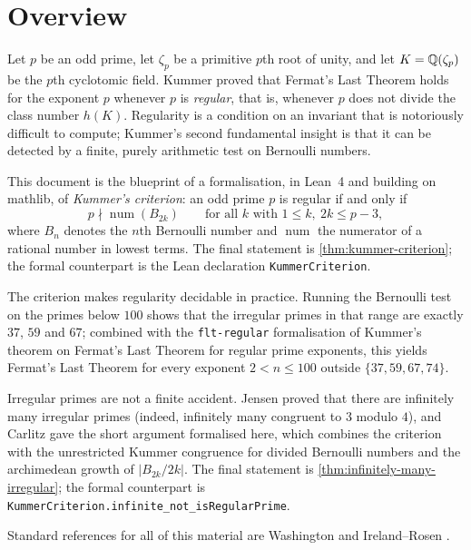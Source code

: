 
\section{Overview}

Let $p$ be an odd prime, let $\zeta_p$ be a primitive $p$th root of unity,
and let $K=\mathbb{Q}(\zeta_p)$ be the $p$th cyclotomic field.  Kummer
\cite{kummer1850} proved that Fermat's Last Theorem holds for the exponent
$p$ whenever $p$ is \emph{regular}, that is, whenever $p$ does not divide
the class number $h(K)$.  Regularity is a condition on an invariant that is
notoriously difficult to compute; Kummer's second fundamental insight is
that it can be detected by a finite, purely arithmetic test on Bernoulli
numbers.

This document is the blueprint of a formalisation, in Lean~4 and building
on mathlib, of \emph{Kummer's criterion}: an odd prime $p$ is regular if
and only if
\[
  p \nmid \operatorname{num}(B_{2k})
  \qquad\text{for all } k \text{ with } 1 \le k,\ 2k \le p-3,
\]
where $B_n$ denotes the $n$th Bernoulli number and $\operatorname{num}$ the
numerator of a rational number in lowest terms.  The final statement is
\cref{thm:kummer-criterion}; the formal counterpart is the Lean declaration
\texttt{KummerCriterion}.

The criterion makes regularity decidable in practice.  Running the
Bernoulli test on the primes below $100$ shows that the irregular primes in
that range are exactly $37$, $59$ and $67$; combined with the
\texttt{flt-regular} formalisation of Kummer's theorem on Fermat's Last
Theorem for regular prime exponents, this yields Fermat's Last Theorem for
every exponent $2 < n \le 100$ outside $\{37, 59, 67, 74\}$.

Irregular primes are not a finite accident.  Jensen \cite{jensen1915}
proved that there are infinitely many irregular primes (indeed, infinitely
many congruent to $3$ modulo $4$), and Carlitz \cite{carlitz1954} gave the
short argument formalised here, which combines the criterion with the
unrestricted Kummer congruence for divided Bernoulli numbers and the
archimedean growth of $|B_{2k}/2k|$.  The final statement is
\cref{thm:infinitely-many-irregular}; the formal counterpart is
\texttt{KummerCriterion.infinite\_not\_isRegularPrime}.

Standard references for all of this material are Washington
\cite{washington} and Ireland--Rosen \cite{ireland-rosen}.

